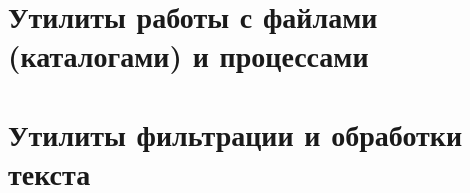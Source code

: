 \section{Утилиты работы с файлами (каталогами) и процессами}

\subsection{}

\subsection{}

\subsection{}

\subsection{}

\subsection{}

\subsection{}

\subsection{}

\subsection{}

\subsection{}

\newpage

\section{Утилиты фильтрации и обработки текста}

\subsection{}

